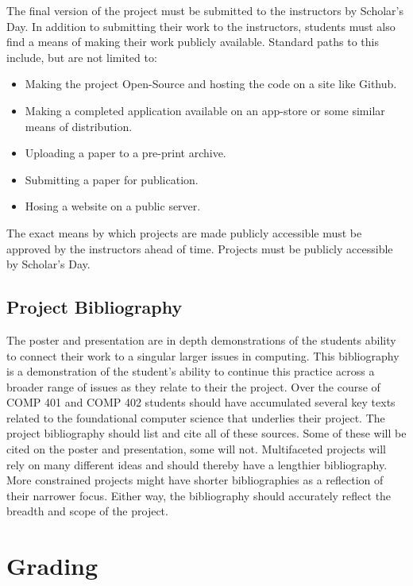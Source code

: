 \documentclass[nobib]{tufte-handout}
\begin{document}
The final version of the project must be submitted to the instructors by Scholar's Day. In addition to submitting their work to the instructors, students must also find a means of making their work publicly available. Standard paths to this include, but are not limited to:
\begin{itemize}
\item Making the project Open-Source and hosting the code on a site like Github.
\item Making a completed application available on an app-store or some similar means of distribution.
\item Uploading a paper to a pre-print archive.
\item Submitting a paper for publication.
\item Hosing a website on a public server.
\end{itemize}
The exact means by which projects are made publicly accessible must be approved by the instructors ahead of time. Projects must be publicly accessible by Scholar's Day.

\subsection{Project Bibliography}

The poster and presentation are in depth demonstrations of the students ability to connect their work to a singular larger issues in computing. This bibliography is a demonstration of the student's ability to continue this practice across a broader range of issues as they relate to their the project. Over the course of COMP 401 and COMP 402 students should have accumulated several key texts related to the foundational computer science that underlies their project. The project bibliography should list and cite all of these sources. Some of these will be cited on the poster and presentation, some will not.  Multifaceted projects will rely on many different ideas and should thereby have a lengthier bibliography. More constrained projects might have shorter bibliographies as a reflection of their narrower focus. Either way, the bibliography should accurately reflect the breadth and scope of the project.

\section{Grading}
\end{document}
